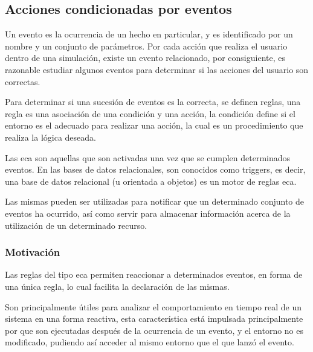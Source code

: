 

\subsection{Acciones condicionadas por eventos}
\label{sec:eca}

Un evento es la ocurrencia de un hecho en particular, y es identificado por un
nombre y un conjunto de parámetros. Por cada acción que realiza el usuario dentro 
de una simulación, existe un evento relacionado, por consiguiente, es razonable 
estudiar algunos eventos para determinar si las acciones del usuario son correctas.

Para determinar si una sucesión de eventos es la correcta, se definen reglas,
una regla es una asociación de una condición y una acción, la condición define
si el entorno es el adecuado para realizar una acción, la cual es un
procedimiento que realiza la lógica deseada.

Las \gls{eca} son aquellas que son activadas una vez que se cumplen determinados
eventos\cite{bailey2004event}. En las bases de datos relacionales, son conocidos
como triggers, es decir, una base de datos relacional (u orientada a objetos) es
un motor de reglas \gls{eca}\cite{bailey2004event,behrends2006combining}.

Las mismas pueden ser utilizadas para notificar que un determinado conjunto de
eventos ha ocurrido\cite{bailey2004event}, así como servir para almacenar
información acerca de la utilización de un determinado recurso.


\subsubsection{Motivación}

Las reglas del tipo \gls{eca} permiten reaccionar a determinados eventos, en
forma de una única regla, lo cual facilita la declaración de las
mismas\cite{bailey2004event}.

Son principalmente útiles para analizar el comportamiento en tiempo real de un
sistema en una forma reactiva\cite{bailey2004event,de2001eca,bailey2002analysis}, 
esta característica está impulsada principalmente por que son ejecutadas después 
de la ocurrencia de un evento, y el entorno no es modificado, pudiendo así acceder 
al mismo entorno que el que lanzó el evento.


